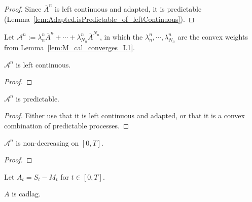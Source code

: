 \begin{proof}
Since $\overline{A}^n$ is left continuous and adapted, it is predictable (Lemma~\ref{lem:Adapted.isPredictable_of_leftContinuous}).
\end{proof}


\begin{definition}\label{def:calA}
Let $\mathcal{A}^n := \lambda^n_n \overline{A}^n+\cdots +\lambda^n_{N_n}\overline{A}^{N_n}$, in which the $\lambda^n_n,\cdots,\lambda^n_{N_n}$ are the convex weights from Lemma~\ref{lem:M_cal_converges_L1}.
\end{definition}


\begin{lemma}\label{lem:leftContinuous_calA}
$\mathcal{A}^n$ is left continuous.
\end{lemma}

\begin{proof}

\end{proof}


\begin{lemma}\label{lem:predictable_calA}
$\mathcal{A}^n$ is predictable.
\end{lemma}

\begin{proof}
Either use that it is left continuous and adapted, or that it is a convex combination of predictable processes.
\end{proof}


\begin{lemma}\label{lem:calA_mono}
$\mathcal{A}^n$ is non-decreasing on $[0,T]$.
\end{lemma}

\begin{proof}

\end{proof}


\begin{definition}\label{def:A}
Let $A_t = S_t - M_t$ for $t \in [0, T]$.
\end{definition}


\begin{lemma}\label{lem:cadlag_A}
$A$ is cadlag.
\end{lemma}

